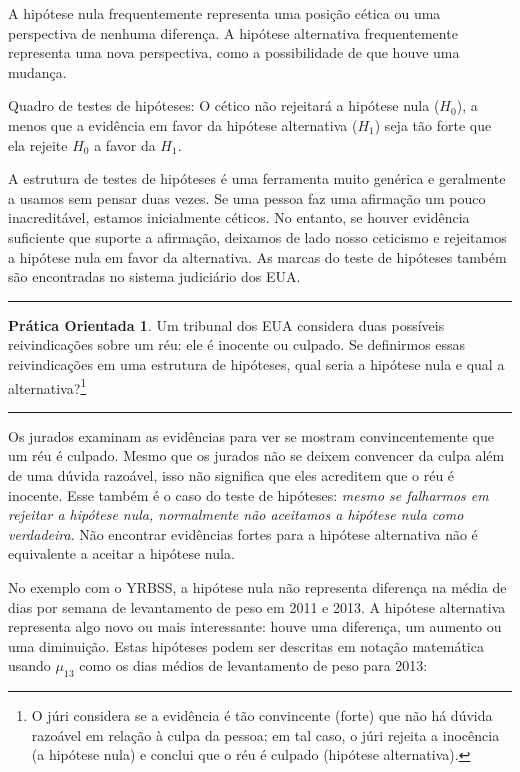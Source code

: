 \documentclass[
]{book}
\theoremstyle{definition}
\theoremstyle{definition}
\theoremstyle{definition}
\newtheorem{exercise}{Prática Orientada}[chapter]
\theoremstyle{definition}
\theoremstyle{remark}
\begin{document}
A hipótese nula frequentemente representa uma posição cética ou uma perspectiva de nenhuma diferença. A hipótese alternativa frequentemente representa uma nova perspectiva, como a possibilidade de que houve uma mudança.

Quadro de testes de hipóteses: O cético não rejeitará a hipótese nula (\(H_0\)), a menos que a evidência em favor da hipótese alternativa (\(H_1\)) seja tão forte que ela rejeite \(H_0\) a favor da \(H_1\).

A estrutura de testes de hipóteses é uma ferramenta muito genérica e geralmente a usamos sem pensar duas vezes. Se uma pessoa faz uma afirmação um pouco inacreditável, estamos inicialmente céticos. No entanto, se houver evidência suficiente que suporte a afirmação, deixamos de lado nosso ceticismo e rejeitamos a hipótese nula em favor da alternativa. As marcas do teste de hipóteses também são encontradas no sistema judiciário dos EUA.

\begin{center}\rule{0.5\linewidth}{0.5pt}\end{center}

\begin{exercise}
\protect\hypertarget{exr:unnamed-chunk-159}{}{\label{exr:unnamed-chunk-159} }Um tribunal dos EUA considera duas possíveis reivindicações sobre um réu: ele é inocente ou culpado. Se definirmos essas reivindicações em uma estrutura de hipóteses, qual seria a hipótese nula e qual a alternativa?\footnote{O júri considera se a evidência é tão convincente (forte) que não há dúvida razoável em relação à culpa da pessoa; em tal caso, o júri rejeita a inocência (a hipótese nula) e conclui que o réu é culpado (hipótese alternativa).}
\end{exercise}

\begin{center}\rule{0.5\linewidth}{0.5pt}\end{center}

Os jurados examinam as evidências para ver se mostram convincentemente que um réu é culpado. Mesmo que os jurados não se deixem convencer da culpa além de uma dúvida razoável, isso não significa que eles acreditem que o réu é inocente. Esse também é o caso do teste de hipóteses: \emph{mesmo se falharmos em rejeitar a hipótese nula, normalmente não aceitamos a hipótese nula como verdadeira}. Não encontrar evidências fortes para a hipótese alternativa não é equivalente a aceitar a hipótese nula.

No exemplo com o YRBSS, a hipótese nula não representa diferença na média de dias por semana de levantamento de peso em 2011 e 2013. A hipótese alternativa representa algo novo ou mais interessante: houve uma diferença, um aumento ou uma diminuição. Estas hipóteses podem ser descritas em notação matemática usando \(\mu_{13}\) como os dias médios de levantamento de peso para 2013:
\end{document}
